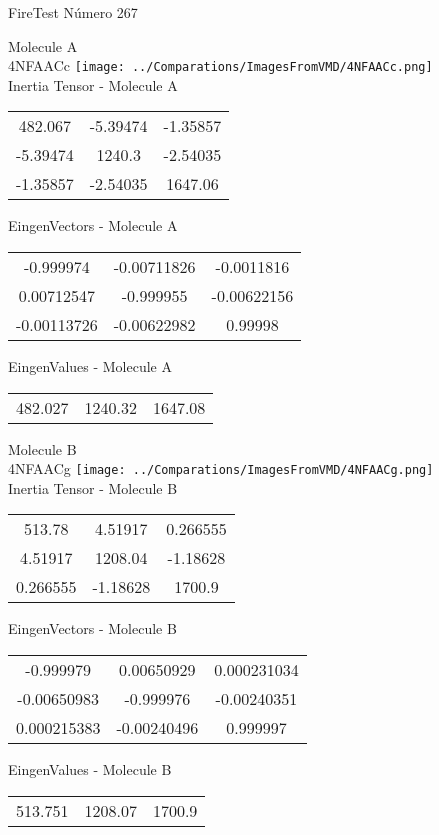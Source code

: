 \vtab[-2cm]
\begin{center}
{\large FireTest \tab Número 267}
\end{center}
\begin{multicols}{2}
\begin{center}

Molecule A \\ 
4NFAACc
\texttt{[image: ../Comparations/ImagesFromVMD/4NFAACc.png]}
\\
Inertia Tensor - Molecule A \\
\vtab

\begin{tabular}{|c c c|}
482.067	 & 	-5.39474	 & 	-1.35857	 \\
-5.39474	 & 	1240.3	 & 	-2.54035	 \\
-1.35857	 & 	-2.54035	 & 	1647.06
\end{tabular}

\vtab
 EingenVectors - Molecule A     \\
\vtab
\begin{tabular}{|c c c|}
-0.999974	 & 	-0.00711826	 & 	-0.0011816	 \\
0.00712547	 & 	-0.999955	 & 	-0.00622156	 \\
-0.00113726	 & 	-0.00622982	 & 	0.99998
\end{tabular}

\vtab
 EingenValues - Molecule A     \\
\vtab
\begin{tabular}{|c c c|}
482.027	 & 	1240.32	 & 	1647.08	 \\
\end{tabular}
\columnbreak

Molecule B \\ 
4NFAACg
\texttt{[image: ../Comparations/ImagesFromVMD/4NFAACg.png]}
\\
Inertia Tensor - Molecule B \\
\vtab

\begin{tabular}{|c c c|}
513.78	 & 	4.51917	 & 	0.266555	 \\
4.51917	 & 	1208.04	 & 	-1.18628	 \\
0.266555	 & 	-1.18628	 & 	1700.9
\end{tabular}

\vtab
 EingenVectors - Molecule B     \\
\vtab
\begin{tabular}{|c c c|}
-0.999979	 & 	0.00650929	 & 	0.000231034	 \\
-0.00650983	 & 	-0.999976	 & 	-0.00240351	 \\
0.000215383	 & 	-0.00240496	 & 	0.999997
\end{tabular}

\vtab
 EingenValues - Molecule B     \\
\vtab
\begin{tabular}{|c c c|}
513.751	 & 	1208.07	 & 	1700.9	 \\
\end{tabular}

\end{center}
\end{multicols}
